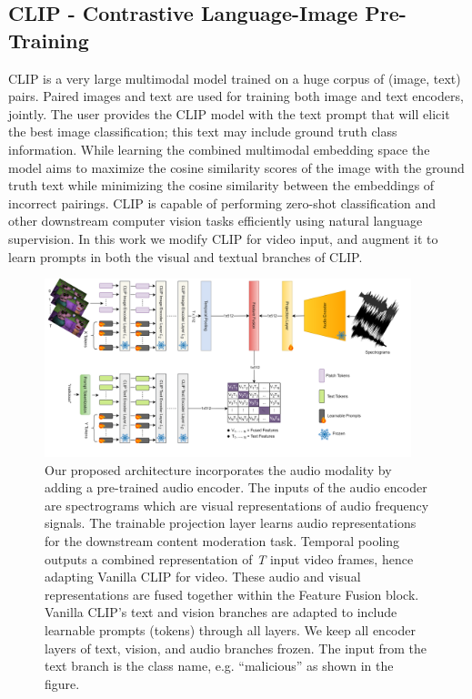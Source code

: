 \documentclass[letterpaper]{article}
\begin{document}
\subsection{CLIP - Contrastive Language-Image Pre-Training}
CLIP \cite{vanilla_clip} is a very large multimodal model trained on a huge corpus of (image, text) pairs. Paired images and text are used for training both image and text encoders, jointly.  The user provides the CLIP model with the text prompt that will elicit the best image classification; this text may include ground truth class information. While learning the combined multimodal embedding space the model aims to maximize the cosine similarity scores of the image with the ground truth text while minimizing the cosine similarity between the embeddings of incorrect pairings. CLIP is capable of performing zero-shot classification and other downstream computer vision tasks efficiently using natural language supervision. In this work we modify CLIP for video input, and augment it to learn prompts in both the visual and textual branches of CLIP.

\begin{figure}[htp]
    \centering
    \includegraphics[width=0.95\textwidth]{figures/fig1-MMOB.png}
    \caption{Our proposed architecture incorporates the audio modality by adding a pre-trained audio encoder. The inputs of the audio encoder are spectrograms which are visual representations of audio frequency signals. The trainable projection layer learns audio representations for the downstream content moderation task. Temporal pooling outputs a combined representation of \textit{T} input video frames, hence adapting Vanilla CLIP for video. These audio and visual representations are fused together within the Feature Fusion block. Vanilla CLIP's text and vision branches are adapted to include learnable prompts (tokens) through all layers. We keep all encoder layers of text, vision, and audio branches frozen. The input from the text branch is the class name, e.g. ``malicious'' as shown in the figure.}  
    \label{fig:model}
\end{figure}
\end{document}
